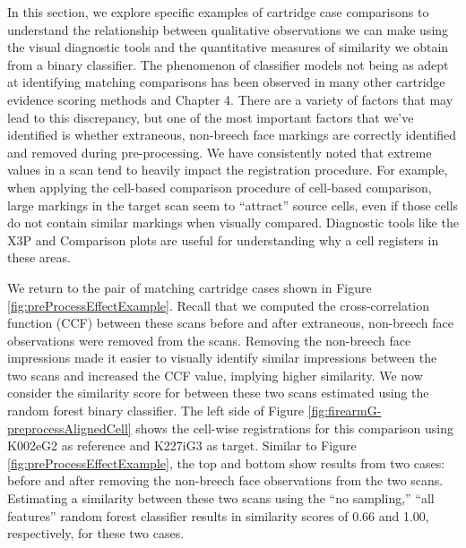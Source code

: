 \documentclass[11pt,]{isuthesis}
\begin{document}
In this section, we explore specific examples of cartridge case comparisons to understand the relationship between qualitative observations we can make using the visual diagnostic tools and the quantitative measures of similarity we obtain from a binary classifier.
The phenomenon of classifier models not being as adept at identifying matching comparisons has been observed in many other cartridge evidence scoring methods \citep{song_proposed_2013, chen_convergence_2017} and Chapter 4.
There are a variety of factors that may lead to this discrepancy, but one of the most important factors that we've identified is whether extraneous, non-breech face markings are correctly identified and removed during pre-processing.
We have consistently noted that extreme values in a scan tend to heavily impact the registration procedure.
For example, when applying the cell-based comparison procedure of cell-based comparison, large markings in the target scan seem to ``attract'' source cells, even if those cells do not contain similar markings when visually compared.
Diagnostic tools like the X3P and Comparison plots are useful for understanding why a cell registers in these areas.

We return to the pair of matching cartridge cases shown in Figure \ref{fig:preProcessEffectExample}.
Recall that we computed the cross-correlation function (CCF) between these scans before and after extraneous, non-breech face observations were removed from the scans.
Removing the non-breech face impressions made it easier to visually identify similar impressions between the two scans and increased the CCF value, implying higher similarity.
We now consider the similarity score for between these two scans estimated using the random forest binary classifier.
The left side of Figure \ref{fig:firearmG-preprocessAlignedCell} shows the cell-wise registrations for this comparison using K002eG2 as reference and K227iG3 as target.
Similar to Figure \ref{fig:preProcessEffectExample}, the top and bottom show results from two cases: before and after removing the non-breech face observations from the two scans.
Estimating a similarity between these two scans using the ``no sampling,'' ``all features'' random forest classifier results in similarity scores of 0.66 and 1.00, respectively, for these two cases.
\end{document}
